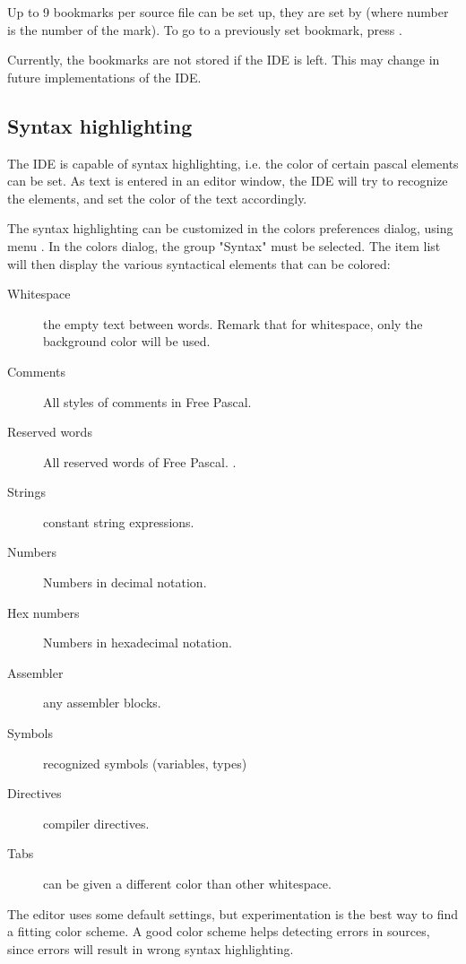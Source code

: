 Up to 9 bookmarks per source file can be set up, they are set by
 (where number is the number of the mark).
To go to a previously set bookmark, press .

\begin{remark}
Currently, the bookmarks are not stored if the IDE is left. This may
change in future implementations of the IDE.
\end{remark}

%
%
\subsection{Syntax highlighting}
\label{se:syntaxhighlighting}
The IDE is capable of syntax highlighting, i.e. the color of certain 
pascal elements can be set. As text is entered in an editor window, 
the IDE will try to recognize the elements, and set the color of the
text accordingly.


The syntax highlighting can be customized in the colors preferences dialog,
using menu . In the colors dialog, the
group "Syntax" must be selected. The item list will then display the 
various syntactical elements that can be colored:
\begin{description}
\item[Whitespace] the empty text between words. Remark that for whitespace,
only the background color will be used.
\item[Comments] All styles of comments in Free Pascal.
\item[Reserved words] All reserved words of Free Pascal. .
\item[Strings] constant string expressions.
\item[Numbers] Numbers in decimal notation.
\item[Hex numbers] Numbers in hexadecimal notation.
\item[Assembler] any assembler blocks.
\item[Symbols] recognized symbols (variables, types)
\item[Directives] compiler directives.
\item[Tabs] can be given a different color than other whitespace.
\end{description}
The editor uses some default settings, but experimentation is the best way
to find a fitting color scheme. A good color scheme helps detecting errors
in sources, since errors will result in wrong syntax highlighting. 

